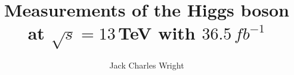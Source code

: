 \documentclass[hyperpdf,bindnopdf]{hepthesis}
\title{Measurements of the Higgs boson at $\sqrt{s}=13$\,TeV with $36.5\,fb^{-1}$}
\author{Jack Charles Wright}
\begin{document}
\begin{frontmatter}

    

\end{frontmatter}


\begin{mainmatter}

    \cleardoublepage

    

    

    

    

    

    

    

    

\end{mainmatter}


\appendix
\begin{appendices}
    
\end{appendices}



\begin{backmatter}

    

\end{backmatter}
\end{document}
